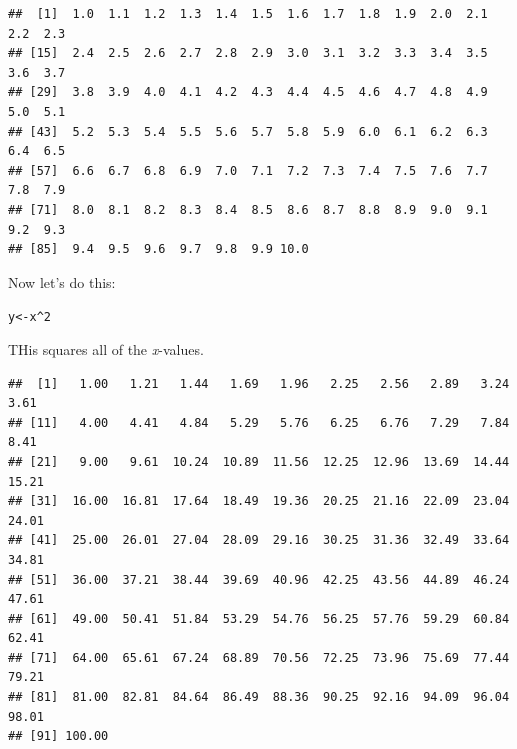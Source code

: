 \documentclass{article}\usepackage[]{graphicx}\usepackage[]{color}
\makeatletter
\newcommand{\hlnum}[1]{\textcolor[rgb]{0.686,0.059,0.569}{#1}}%
\newcommand{\hlopt}[1]{\textcolor[rgb]{0,0,0}{#1}}%
\newcommand{\hlstd}[1]{\textcolor[rgb]{0.345,0.345,0.345}{#1}}%
\newcommand{\hlkwb}[1]{\textcolor[rgb]{0.69,0.353,0.396}{#1}}%
\newenvironment{kframe}{%
 \def\at@end@of@kframe{}%
 \ifinner\ifhmode%
  \def\at@end@of@kframe{\end{minipage}}%
  \begin{minipage}{\columnwidth}%
 \fi\fi%
 \def\FrameCommand##1{\hskip\@totalleftmargin \hskip-\fboxsep
 \colorbox{shadecolor}{##1}\hskip-\fboxsep
     \hskip-\linewidth \hskip-\@totalleftmargin \hskip\columnwidth}%
 \MakeFramed {\advance\hsize-\width
   \@totalleftmargin\z@ \linewidth\hsize
   \@setminipage}}%
 {\par\unskip\endMakeFramed%
 \at@end@of@kframe}
\newenvironment{knitrout}{}{} %
\makeatother
\begin{document}
\begin{knitrout}
\color{fgcolor}\begin{kframe}
\begin{verbatim}
##  [1]  1.0  1.1  1.2  1.3  1.4  1.5  1.6  1.7  1.8  1.9  2.0  2.1  2.2  2.3
## [15]  2.4  2.5  2.6  2.7  2.8  2.9  3.0  3.1  3.2  3.3  3.4  3.5  3.6  3.7
## [29]  3.8  3.9  4.0  4.1  4.2  4.3  4.4  4.5  4.6  4.7  4.8  4.9  5.0  5.1
## [43]  5.2  5.3  5.4  5.5  5.6  5.7  5.8  5.9  6.0  6.1  6.2  6.3  6.4  6.5
## [57]  6.6  6.7  6.8  6.9  7.0  7.1  7.2  7.3  7.4  7.5  7.6  7.7  7.8  7.9
## [71]  8.0  8.1  8.2  8.3  8.4  8.5  8.6  8.7  8.8  8.9  9.0  9.1  9.2  9.3
## [85]  9.4  9.5  9.6  9.7  9.8  9.9 10.0
\end{verbatim}
\end{kframe}
\end{knitrout}

Now let's do this:
\begin{knitrout}
\color{fgcolor}\begin{kframe}
\begin{alltt}
\hlstd{y}\hlkwb{<-}\hlstd{x}\hlopt{^}\hlnum{2}
\end{alltt}
\end{kframe}
\end{knitrout}

THis squares all of the \textit{x}-values.
\begin{knitrout}
\color{fgcolor}\begin{kframe}
\begin{verbatim}
##  [1]   1.00   1.21   1.44   1.69   1.96   2.25   2.56   2.89   3.24   3.61
## [11]   4.00   4.41   4.84   5.29   5.76   6.25   6.76   7.29   7.84   8.41
## [21]   9.00   9.61  10.24  10.89  11.56  12.25  12.96  13.69  14.44  15.21
## [31]  16.00  16.81  17.64  18.49  19.36  20.25  21.16  22.09  23.04  24.01
## [41]  25.00  26.01  27.04  28.09  29.16  30.25  31.36  32.49  33.64  34.81
## [51]  36.00  37.21  38.44  39.69  40.96  42.25  43.56  44.89  46.24  47.61
## [61]  49.00  50.41  51.84  53.29  54.76  56.25  57.76  59.29  60.84  62.41
## [71]  64.00  65.61  67.24  68.89  70.56  72.25  73.96  75.69  77.44  79.21
## [81]  81.00  82.81  84.64  86.49  88.36  90.25  92.16  94.09  96.04  98.01
## [91] 100.00
\end{verbatim}
\end{kframe}
\end{knitrout}
\end{document}
